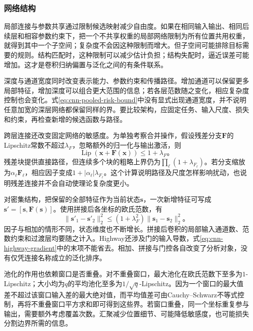 \subsubsection{网络结构}
\label{sec:cnn-structure-generalization}

局部连接与参数共享通过限制候选映射减少自由度。如果在相同输入输出、相同后续层和相容参数约束下，把一个不共享权重的局部网络限制为所有位置共用权重，就得到其中一个子空间；复杂度不会因这种限制而增大。但子空间可能排除目标需要的规则。结构匹配时，这种限制可以减少估计负担；结构失配时，逼近误差可能增加。这才是卷积归纳偏置与泛化之间的有条件联系。

深度与通道宽度同时改变表示能力、参数约束和传播路径。增加通道可以保留更多局部特征，增加深度可以组合更大范围的信息；若各层范数随之变化，相应复杂度控制也会变化。式\eqref{eq:cnn-pooled-risk-bound}中没有显式出现通道宽度，并不说明任意加宽的深层网络都保留同样的界。要比较架构，应固定任务、输入尺度、损失和约束，再检查新增的候选函数与路径。

跨层连接还改变固定网络的敏感度。为单独考察合并操作，假设残差分支$\bm F$的Lipschitz常数不超过$\lambda_F$，忽略额外的归一化与输出激活，则
\begin{equation}
  \operatorname{Lip}(\bm x+\bm F(\bm x))\leq1+\lambda_F\text{。}
  \label{eq:cnn-residual-lipschitz}
\end{equation}
残差块提供直接路径，但连续多个块的粗略上界仍为$\prod_\ell(1+\lambda_{F_\ell})$。若分支缩放为$\alpha_\ell\bm F_\ell$，相应因子变成$1+|\alpha_\ell|\lambda_{F_\ell}$。这个计算说明路径及尺度怎样影响扰动，也说明残差连接并不会自动使理论复杂度更小。

对密集结构，把保留的全部特征作为当前状态$\bm s$，一次新增特征可写成$\bm s'=[\bm s,\bm F(\bm s)]$。使用拼接后各坐标的欧氏范数，有
\begin{equation}
  \lVert\bm s'_1-\bm s'_2\rVert_2^2
  \leq(1+\lambda_F^2)\lVert\bm s_1-\bm s_2\rVert_2^2\text{。}
  \label{eq:cnn-dense-lipschitz}
\end{equation}
因子与相加的情形不同，状态维度也不断增长。拼接后卷积的局部输入通道数、范数约束和过渡层均要随之计入。Highway还涉及门的输入导数，式\eqref{eq:cnn-highway-gradient}中的末项不能省去。相加、拼接与门控各自改变了分析对象，没有仅凭连接名称成立的泛化排序。

池化的作用也依赖窗口是否重叠。对不重叠窗口，最大池化在欧氏范数下至多为$1$-Lipschitz；大小均为$q$的平均池化至多为$1/\sqrt q$-Lipschitz。因为一个窗口的最大值差不超过该窗口输入差的最大绝对值，而平均值差可由Cauchy--Schwarz不等式控制，再将不重叠窗口平方求和即可得到这些界。若窗口重叠，同一个坐标重复参与输出，需要额外考虑覆盖次数。汇聚减少位置细节、可能降低敏感度，也可能损失分割边界所需的信息。


